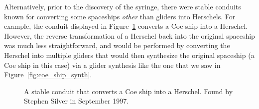 Alternatively, prior to the discovery of the syringe, there were stable conduits known for converting some spaceships \emph{other} than gliders into Herschels. For example, the conduit displayed in Figure~\ref{fig:coe_to_herschel} converts a Coe ship into a Herschel. However, the reverse transformation of a Herschel back into the original spaceship was much less straightforward, and would be performed by converting the Herschel into multiple gliders that would then synthesize the original spaceship (a Coe ship in this case) via a glider synthesis like the one that we saw in Figure~\ref{fig:coe_ship_synth}.

\begin{figure}[!htb]
	\centering{}
	\caption{A stable conduit that converts a Coe ship into a Herschel. Found by Stephen Silver in September 1997.}\label{fig:coe_to_herschel}
\end{figure}





